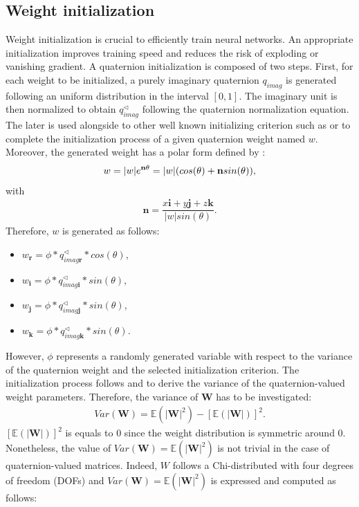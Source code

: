 \documentclass[a4paper]{article}
\def\i{\textbf{i}}
\def\j{\textbf{j}}
\def\W{\textbf{W}}
\begin{document}
\subsection{Weight initialization}
\label{subsec:init}
Weight initialization is crucial to efficiently train neural networks. An appropriate initialization improves training speed and reduces the risk of exploding or vanishing gradient. A quaternion initialization is composed of two steps. First, for each weight to be initialized, a purely imaginary quaternion $q_{imag}$ is generated following an uniform distribution in the interval $[0,1]$. The imaginary unit is then normalized to obtain $q_{imag}^\triangleleft$ following the quaternion normalization equation. The later is used alongside to other well known initializing criterion such as \cite{glorot2010understanding} or \cite{he2015delving} to complete the initialization process of a given quaternion weight named $w$. Moreover, the generated weight has a polar form defined by : 
\begin{align}
\centering
w=|w|e^{\textbf{n}\theta}=|w|(cos(\theta) + \textbf{n}sin(\theta)),
\end{align}
 with
 \begin{align}
 \textbf{n} = \dfrac{x\i + y\j + z\textbf{k}}{|w|sin(\theta)}.
 \end{align}
 Therefore, $w$ is generated as follows:
\begin{itemize}
	\item $ w_\textbf{r} = \phi * q^\triangleleft_{imag\textbf{r}} * cos(\theta)$,
	\item $ w_\textbf{i} = \phi * q^\triangleleft_{imag\textbf{i}} * sin(\theta)$,
	\item $ w_\textbf{j} = \phi * q^\triangleleft_{imag\textbf{j}} * sin(\theta)$,
	\item $ w_\textbf{k} = \phi * q^\triangleleft_{imag\textbf{k}} * sin(\theta)$.
\end{itemize}
However, $\phi$ represents a randomly generated variable with respect to the variance of the quaternion weight and the selected initialization criterion. The initialization process follows \cite{glorot2010understanding} and \cite{he2015delving} to derive the variance of the quaternion-valued weight parameters. Therefore, the variance of $\W$ has to be investigated:
\begin{align}
	Var(\W) = \mathbb{E}(|\W|^2) -  [\mathbb{E}(|\W|)]^2.
\end{align}
$[\mathbb{E}(|\W|)]^2$ is equals to $0$ since the weight distribution is symmetric around $0$. Nonetheless, the value of $Var(\W) = \mathbb{E}(|\W|^2)$ is not trivial in the case of quaternion-valued matrices. Indeed, $W$ follows a Chi-distributed with four degrees of freedom (DOFs) and $Var(\W) = \mathbb{E}(|\W|^2)$ is expressed and computed as follows:
\end{document}
